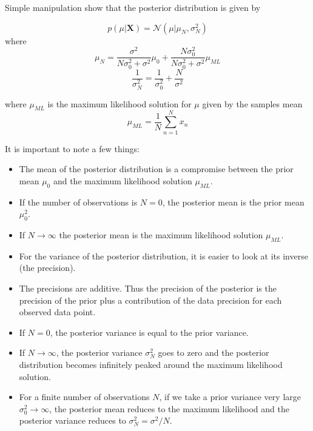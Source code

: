 Simple manipulation show that the posterior distribution is given by

\begin{equation}
    p(\mu | \boldsymbol{X}) = \mathcal{N}(\mu | \mu_N, \sigma_N^2)
\end{equation}
where
\begin{equation}
    \mu_N = \frac{\sigma^2}{N\sigma_0^2 + \sigma^2} \mu_0 + \frac{N\sigma_0^2}{N\sigma_0^2 + \sigma^2}\mu_{ML}
\end{equation}
\begin{equation}
    \frac{1}{\sigma_N^2} = \frac{1}{\sigma_0^2} + \frac{N}{\sigma^2}
\end{equation}

where $\mu_{ML}$ is the maximum likelihood solution for $\mu$ given by the samples mean
\begin{equation}
    \mu_{ML} = \frac{1}{N}\sum_{n=1}^{N} x_n
\end{equation}

It is important to note a few things:
\begin{itemize}
    \item The mean of the posterior distribution is a compromise between the prior mean $\mu_0$ and the maximum likelihood solution $\mu_{ML}$.
    \item If the number of observations is $N = 0$, the posterior mean is the prior mean $\mu_0^2$.
    \item If $N \rightarrow \infty$ the posterior mean is the maximum likelihood solution $\mu_{ML}$.
    \item For the variance of the posterior distribution, it is easier to look at its inverse (the precision).
    \item The precisions are additive. Thus the precision of the posterior is the precision of the prior plus a contribution of the data precision for each observed data point.
    \item If $N = 0$, the posterior variance is equal to the prior variance.
    \item If $N \rightarrow \infty$, the posterior variance $\sigma_N^2$ goes to zero and the posterior distribution becomes infinitely peaked around the maximum likelihood solution.
    \item For a finite number of observations $N$, if we take a prior variance very large $\sigma_0^2 \rightarrow \infty$, the posterior mean reduces to the maximum likelihood and the posterior variance reduces to $\sigma_N^2 = \sigma^2/N$.
\end{itemize}